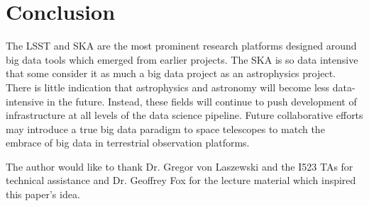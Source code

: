 \documentclass[sigconf]{acmart}
\begin{document}
\section{Conclusion}
The LSST and SKA are the most prominent research platforms designed around big data tools which emerged from earlier projects. The SKA is so data intensive that some consider it as much a big data project as an astrophysics project\cite{IBM2012}. There is little indication that astrophysics and astronomy will become less data-intensive in the future. Instead, these fields will continue to push development of infrastructure at all levels of the data science pipeline. Future collaborative efforts may introduce a true big data paradigm to space telescopes to match the embrace of big data in terrestrial observation platforms. 

\begin{acks}
The author would like to thank Dr. Gregor von Laszewski and the I523 TAs for  technical assistance and Dr. Geoffrey Fox for the lecture material which inspired this paper's idea. 
\end{acks}



\end{document}
